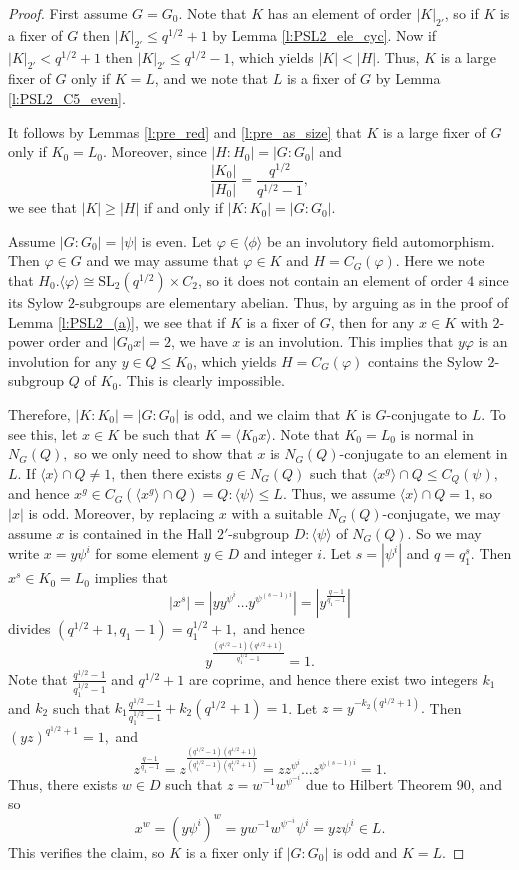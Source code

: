 \documentclass[twoside,a4paper,reqno,11pt]{amsart}
\newcommand{\<}{\langle}
\renewcommand{\>}{\rangle}
\newcommand{\la}{\langle}
\newcommand{\ra}{\rangle}
\newcommand{\leqs}{\leqslant}
\newcommand{\geqs}{\geqslant}
\newcommand{\SL}{\mathrm{SL}}
\theoremstyle{definition}
\begin{document}
	\begin{proof}
		First assume $G = G_0$. Note that $K$ has an element of order $|K|_{2'}$, so if $K$ is a fixer of $G$ then $|K|_{2'}\leqs q^{1/2}+1$ by Lemma \ref{l:PSL2_ele_cyc}. Now if $|K|_{2'} < q^{1/2}+1$ then $|K|_{2'} \leqs q^{1/2}-1$, which yields $|K| < |H|$. Thus, $K$ is a large fixer of $G$ only if $K = L$, and we note that $L$ is a fixer of $G$ by Lemma \ref{l:PSL2_C5_even}.
		
		It follows by Lemmas \ref{l:pre_red} and \ref{l:pre_as_size} that $K$ is a large fixer of $G$ only if $K_0 = L_0$. Moreover, since $|H:H_0| = |G:G_0|$ and
		\begin{equation*}
		\frac{|K_0|}{|H_0|} = \frac{q^{1/2}}{q^{1/2}-1},
		\end{equation*}
		we see that $|K| \geqs |H|$ if and only if $|K:K_0| = |G:G_0|$.
		
		Assume $|G:G_0| = |\psi|$ is even. Let $\varphi\in\la\phi\ra$ be an involutory field automorphism. Then $\varphi\in G$ and we may assume that $\varphi\in K$ and $H = C_G(\varphi)$. Here we note that $H_0.\la \varphi\ra\cong \SL_2(q^{1/2})\times C_2$, so it does not contain an element of order $4$ since its Sylow $2$-subgroups are elementary abelian. Thus, by arguing as in the proof of Lemma \ref{l:PSL2_(a)}, we see that if $K$ is a fixer of $G$, then for any $x\in K$ with $2$-power order and $|G_0x| = 2$, we have $x$ is an involution. This implies that $y\varphi$ is an involution for any $y\in Q\leqs K_0$, which yields $H = C_G(\varphi)$ contains the Sylow $2$-subgroup $Q$ of $K_0$. This is clearly impossible.
		
		Therefore, $|K:K_0|=|G:G_0|$ is odd, and we claim that $K$ is $G$-conjugate to $L$. To see this, let $x\in K$ be such that $K=\la K_0x \ra.$
		Note that $K_0=L_0$ is normal in $N_G(Q),$ so we only need to show that $x$ is $N_G(Q)$-conjugate to an element in $L.$
		If $\la x \ra \cap Q\ne 1$, then there exists $g\in N_G(Q)$ such that $\la  x^g \ra \cap Q \leqs C_{Q}(\psi ),$ and hence $x^g\in C_G(\la x^g \ra\cap Q)=Q{:}\la \psi \ra \leqs L.$ Thus, we assume $\la x\ra\cap Q=1$, so $|x|$ is odd. Moreover, by replacing $x$ with a suitable $N_G(Q)$-conjugate, we may assume $x$ is contained in the Hall $2'$-subgroup $D{:}\la \psi \ra$ of $N_G(Q).$ So we may write $x=y\psi^i$ for some element $y\in D$ and integer $i$. Let $s=|\psi^i|$ and $q=q_1^s.$ Then $x^s\in K_0=L_0$ implies that
		$$|x^s|=|yy^{\psi^i}\dots y^{\psi^{(s-1)i}}|=|y^{\frac{q-1}{q_1-1}}|$$ divides $(q^{1/2}+1,q_1-1)=q_1^{1/2}+1,$ and hence
		$$y^{\frac{(q^{1/2}-1)(q^{1/2}+1)}{q_1^{1/2}-1}}=1.$$
		Note that $\frac{q^{1/2}-1}{q_1^{1/2}-1}$ and $q^{1/2}+1$ are coprime, and hence there exist two integers $k_1$ and $k_2$ such that $k_1\frac{q^{1/2}-1}{q_1^{1/2}-1}+k_2(q^{1/2}+1)=1$. Let $z=y^{-k_2(q^{1/2}+1)}.$ Then $(yz)^{q^{1/2}+1}=1,$ and  $$z^\frac{q-1}{q_1-1}=z^{\frac{(q^{1/2}-1)(q^{1/2}+1)}{(q_1^{1/2}-1)(q_1^{1/2}+1)}}=zz^{\psi^i}\dots z^{\psi^{(s-1)i}}=1.$$ Thus, there exists $w\in D$ such that $z=w^{-1}w^{\psi^{-i}}$ due to Hilbert Theorem 90, and so $$x^{w}=(y\psi^i)^{w}=yw^{-1}w^{\psi^{-i}}\psi^i=yz\psi^i\in L.$$ This verifies the claim, so $K$ is a fixer only if $|G:G_0|$ is odd and $K = L$.
		

\end{proof}
\end{document}

